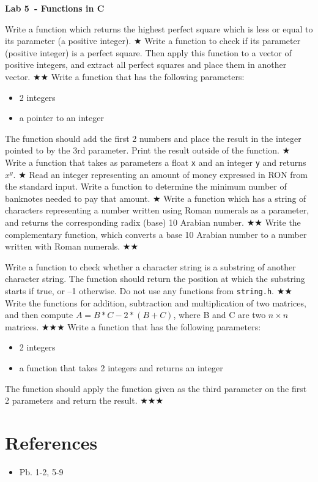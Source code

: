 \documentclass{exam}
\newcommand\labnr{5}
\newcommand\lab{Lab \labnr\ - Functions in C}
\newcommand\lvlez{$\bigstar$}
\newcommand\lvlmed{\lvlez\lvlez}
\newcommand\lvlhard{\lvlmed\lvlez}
\begin{document}
\begin{center}
   \vspace*{0cm}
   \bfseries\LARGE
   \lab
   \vspace*{1cm}
\end{center}


\begin{questions}   
   \question Write a function which returns the highest perfect square which is less or equal to its
parameter (a positive integer). \lvlez   
   \question Write a function to check if its parameter (positive integer) is a perfect square. Then apply
this function to a vector of positive integers, and extract all perfect squares and place them in
another vector. \lvlmed
   \question Write a function that has the following parameters:
   \begin{itemize}
      \item 2 integers
      \item a pointer to an integer
   \end{itemize}
   The function should add the first 2 numbers and place the result in the integer pointed to by the 3rd parameter. 
   Print the result outside of the function. \lvlez
   \question Write a function that takes as parameters a float \verb|x| and an integer \verb|y| and returns $x^y$. \lvlez
   \question Read an integer representing an amount of money expressed in RON from the standard
input. Write a function to determine the minimum number of banknotes needed to pay that
amount. \lvlez
   \question Write a function which has a string of characters representing a number written using Roman
numerals as a parameter, and returns the corresponding radix (base) 10 Arabian number. \lvlmed
   \question Write the complementary function, which converts a base 10 Arabian number to a number
written with Roman numerals. \lvlmed



   \question Write a function to check whether a character string is a substring of another character
string. The function should return the position at which the substring starts if true, or –1
otherwise. Do not use any functions from \verb|string.h|. \lvlmed
   \question Write the functions for addition, subtraction and multiplication of two matrices, and then
compute
$A=B*C - 2*(B+C)$, where B and C are two $n \times n$ matrices. \lvlhard
   \question Write a function that has the following parameters:
   \begin{itemize}
      \item 2 integers
      \item a function that takes 2 integers and returns an integer
   \end{itemize}
   The function should apply the function given as the third parameter on the first 2 parameters and return the result.
   \lvlhard
   

\end{questions}
\medskip
\section*{References}
\begin{itemize}
   \item Pb. 1-2, 5-9 \cite{cplab05}
\end{itemize}
\printbibliography[heading=none]
\end{document}

